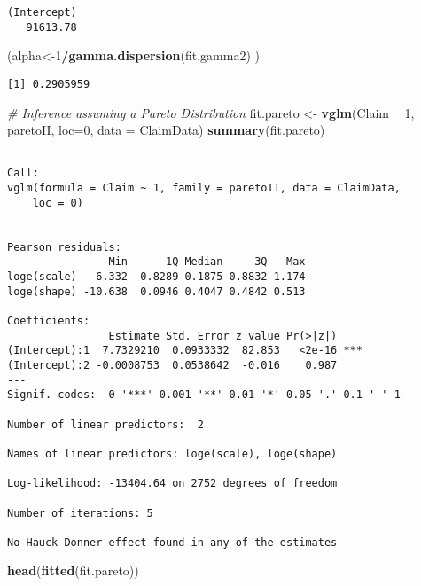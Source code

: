 \documentclass[]{book}
\newenvironment{Shaded}{\begin{snugshade}}{\end{snugshade}}
\newcommand{\KeywordTok}[1]{\textcolor[rgb]{0.13,0.29,0.53}{\textbf{#1}}}
\newcommand{\DataTypeTok}[1]{\textcolor[rgb]{0.13,0.29,0.53}{#1}}
\newcommand{\DecValTok}[1]{\textcolor[rgb]{0.00,0.00,0.81}{#1}}
\newcommand{\StringTok}[1]{\textcolor[rgb]{0.31,0.60,0.02}{#1}}
\newcommand{\CommentTok}[1]{\textcolor[rgb]{0.56,0.35,0.01}{\textit{#1}}}
\newcommand{\OperatorTok}[1]{\textcolor[rgb]{0.81,0.36,0.00}{\textbf{#1}}}
\newcommand{\NormalTok}[1]{#1}
\theoremstyle{definition}
\theoremstyle{definition}
\theoremstyle{definition}
\theoremstyle{remark}
\begin{document}
\begin{verbatim}
(Intercept) 
   91613.78 
\end{verbatim}

\begin{Shaded}
\begin{Highlighting}[]
\NormalTok{(alpha<-}\DecValTok{1}\OperatorTok{/}\KeywordTok{gamma.dispersion}\NormalTok{(fit.gamma2) )}
\end{Highlighting}
\end{Shaded}

\begin{verbatim}
[1] 0.2905959
\end{verbatim}

\begin{Shaded}
\begin{Highlighting}[]
\CommentTok{#  Inference assuming a Pareto Distribution}
\NormalTok{fit.pareto <-}\StringTok{ }\KeywordTok{vglm}\NormalTok{(Claim }\OperatorTok{~}\StringTok{ }\DecValTok{1}\NormalTok{, paretoII, }\DataTypeTok{loc=}\DecValTok{0}\NormalTok{, }\DataTypeTok{data =}\NormalTok{ ClaimData)}
\KeywordTok{summary}\NormalTok{(fit.pareto)}
\end{Highlighting}
\end{Shaded}

\begin{verbatim}

Call:
vglm(formula = Claim ~ 1, family = paretoII, data = ClaimData, 
    loc = 0)


Pearson residuals:
                Min      1Q Median     3Q   Max
loge(scale)  -6.332 -0.8289 0.1875 0.8832 1.174
loge(shape) -10.638  0.0946 0.4047 0.4842 0.513

Coefficients: 
                Estimate Std. Error z value Pr(>|z|)    
(Intercept):1  7.7329210  0.0933332  82.853   <2e-16 ***
(Intercept):2 -0.0008753  0.0538642  -0.016    0.987    
---
Signif. codes:  0 '***' 0.001 '**' 0.01 '*' 0.05 '.' 0.1 ' ' 1

Number of linear predictors:  2 

Names of linear predictors: loge(scale), loge(shape)

Log-likelihood: -13404.64 on 2752 degrees of freedom

Number of iterations: 5 

No Hauck-Donner effect found in any of the estimates
\end{verbatim}

\begin{Shaded}
\begin{Highlighting}[]
\KeywordTok{head}\NormalTok{(}\KeywordTok{fitted}\NormalTok{(fit.pareto))}
\end{Highlighting}
\end{Shaded}
\end{document}
